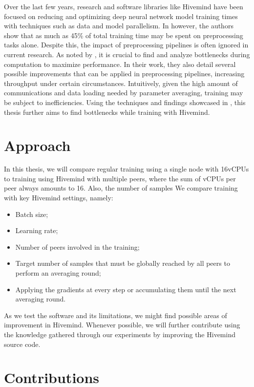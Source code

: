 Over the last few years, research and software libraries like Hivemind have been focused on reducing and optimizing deep neural network model training times with techniques such as data and model parallelism.
In \cite{xin2021production} however, the authors show that as much as 45\% of total training time may be spent on preprocessing tasks alone.
Despite this, the impact of preprocessing pipelines is often ignored in current research.
As noted by \citeauthor{isenko2022bottleneck} \cite{isenko2022bottleneck}, it is crucial to find and analyze bottlenecks during computation to maximize performance.
In their work, they also detail several possible improvements that can be applied in preprocessing pipelines, increasing throughput under certain circumstances.
Intuitively, given the high amount of communications and data loading needed by parameter averaging, training may be subject to inefficiencies.
Using the techniques and findings showcased in \cite{isenko2022bottleneck}, this thesis further aims to find bottlenecks while training with Hivemind.

\section{Approach}

In this thesis, we will compare regular training using a single node with 16vCPUs to training using Hivemind with multiple peers, where the sum of vCPUs per peer always amounts to 16.
Also, the number of samples
We compare training with key Hivemind settings, namely:
\begin{itemize}
    \item Batch size;
    \item Learning rate;
    \item Number of peers involved in the training;
    \item Target number of samples that must be globally reached by all peers to perform an averaging round;
    \item Applying the gradients at every step or accumulating them until the next averaging round.
\end{itemize}

As we test the software and its limitations, we might find possible areas of improvement in Hivemind.
Whenever possible, we will further contribute using the knowledge gathered through our experiments by improving the Hivemind \cite{hivemind} source code.

\section{Contributions}

